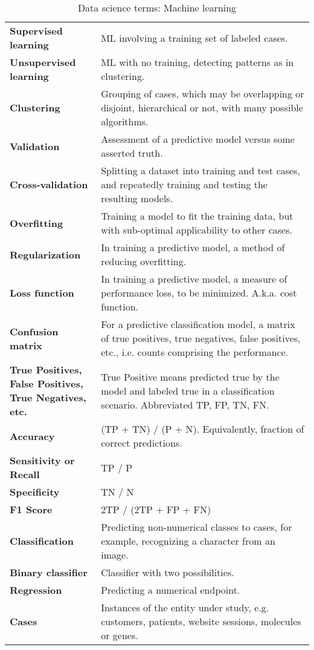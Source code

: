 \begin{appendices}
\begin{longtable}{p{0.3\linewidth}p{0.7\linewidth}}
\caption{Data science terms: Machine learning}\\
\hline
\textbf{Supervised learning} & ML involving a training set of labeled cases. \\
\textbf{Unsupervised learning} & ML with no training, detecting patterns as in clustering. \\
\textbf{Clustering} & Grouping of cases, which may be overlapping or disjoint, hierarchical or not, with many possible algorithms. \\
\textbf{Validation} & Assessment of a predictive model versus some asserted truth. \\
\textbf{Cross-validation} & Splitting a dataset into training and test cases, and repeatedly training and testing the resulting models. \\
\textbf{Overfitting} & Training a model to fit the training data, but with sub-optimal applicability to other cases. \\
\textbf{Regularization} & In training a predictive model, a method of reducing overfitting. \\
\textbf{Loss function} & In training a predictive model, a measure of performance loss, to be minimized.  A.k.a. cost function. \\
\textbf{Confusion matrix} & For a predictive classification model, a matrix of true positives, true negatives, false positives, etc., i.e. counts comprising the performance. \\
\textbf{True Positives, False Positives, True Negatives, etc.} & True Positive means predicted true by the model and labeled true in a classification scenario.  Abbreviated TP, FP, TN, FN. \\
\textbf{Accuracy} & (TP + TN) / (P + N).  Equivalently, fraction of correct predictions. \\
\textbf{Sensitivity or Recall} & TP / P \\
\textbf{Specificity} & TN / N \\
\textbf{F1 Score} & 2TP / (2TP + FP + FN) \\
\textbf{Classification} & Predicting non-numerical classes to cases, for example, recognizing a character from an image. \\
\textbf{Binary classifier} & Classifier with two possibilities. \\
\textbf{Regression} & Predicting a numerical endpoint. \\
\textbf{Cases} & Instances of the entity under study, e.g. customers, patients, website sessions, molecules or genes. \\

\end{longtable}
\end{appendices}
